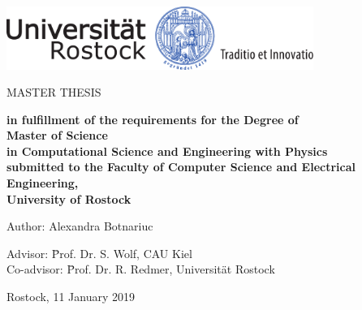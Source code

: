 \thispagestyle{empty}
\begin{center}
\vspace*{-2cm}
\includegraphics[width=0.75\textwidth]{img/unilogo-siegel-farbe}\\
\vspace*{3cm}
    {\titlefont \huge \onehalfspacing
	\thetitle 
    \par}
   \vfill
	\Large{\uppercase{Master Thesis}} 

\end{center}\par

\vspace{1cm}

\begin{center}
\textbf{
	in fulfillment of the requirements for the Degree of \\
	\vspace{5mm}
	{\Large Master of Science} \\
	\vspace{5mm}
	in Computational Science and Engineering with Physics \\
	submitted to the Faculty of Computer Science and Electrical Engineering, \\
	University of Rostock}
\end{center}
\vspace*{1cm}
\noindent\begin{minipage}[b]{\textwidth}
{
\noindent Author: Alexandra Botnariuc \\
\vspace*{1.5cm}

	\begin{tabbing}
	Advisor:  \= Prof. Dr. S. Wolf, CAU Kiel\\
	Co-advisor: \=  Prof. Dr. R. Redmer, Universität Rostock \\
	\end{tabbing}

  \noindent Rostock, 11 January 2019
  \par
  }
\end{minipage}


